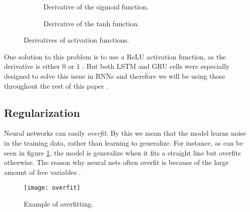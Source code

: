\begin{figure}[ht]
  \centering
  \begin{subfigure}[b]{0.45\textwidth}
    \centering
    \caption{Derivative of the sigmoid function.}
  \end{subfigure}
  \begin{subfigure}[b]{0.45\textwidth}
    \centering
    \caption{Derivative of the tanh function.}
  \end{subfigure}
  \caption{Derivatives of activation functions.}
\end{figure}

One solution to this problem is to use a ReLU activation function, as the derivative is either $0$ or $1$ \cite{britz_2016}.
But both LSTM and GRU cells were especially designed to solve this issue in RNNs and therefore we will be using those throughout the rest of this paper \cite{LSTM,hochreiter1997long,cho2014learning}.

\subsection{Regularization}

Neural networks can easily \textit{overfit}.
By this we mean that the model learns noise in the training data, rather than learning to generalize.
For instance, as can be seen in figure \ref{fig:overfit}, the model is generalize when it fits a straight line but overfits otherwise.
The reason why neural nets often overfit is because of the large amount of free variables \cite{nielsen_2017}.

\begin{figure}[ht]
  \centering
  \texttt{[image: overfit]}
  \caption{Example of overfitting.}
  \label{fig:overfit}
\end{figure}

